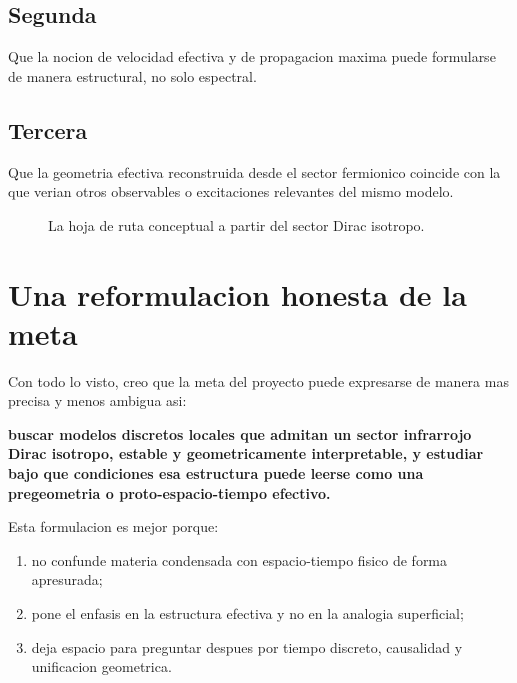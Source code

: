 \subsection{Segunda}
Que la nocion de velocidad efectiva y de propagacion maxima puede formularse de manera estructural, no solo espectral.

\subsection{Tercera}
Que la geometria efectiva reconstruida desde el sector fermionico coincide con la que verian otros observables o excitaciones relevantes del mismo modelo.

\begin{figure}[h!]
\centering
{}
\caption{La hoja de ruta conceptual a partir del sector Dirac isotropo.}
\end{figure}

\section{Una reformulacion honesta de la meta}
Con todo lo visto, creo que la meta del proyecto puede expresarse de manera mas precisa y menos ambigua asi:
\begin{displayquote}
\textbf{buscar modelos discretos locales que admitan un sector infrarrojo Dirac isotropo, estable y geometricamente interpretable, y estudiar bajo que condiciones esa estructura puede leerse como una pregeometria o proto-espacio-tiempo efectivo.}
\end{displayquote}

Esta formulacion es mejor porque:
\begin{enumerate}[label=\arabic*.]
    \item no confunde materia condensada con espacio-tiempo fisico de forma apresurada;
    \item pone el enfasis en la estructura efectiva y no en la analogia superficial;
    \item deja espacio para preguntar despues por tiempo discreto, causalidad y unificacion geometrica.
\end{enumerate}

